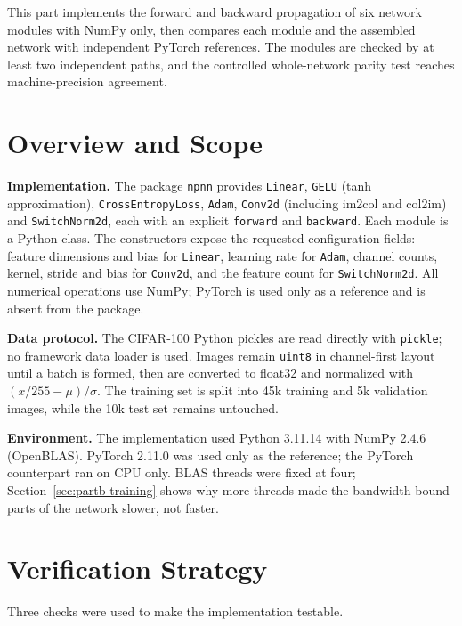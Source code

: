 \documentclass[10pt]{article}
\begin{document}
This part implements the forward and backward propagation of six network modules with NumPy only,
then compares each module and the assembled network with independent PyTorch references. The modules
are checked by at least two independent paths, and the controlled whole-network parity test reaches
machine-precision agreement.

\section{Overview and Scope}
\label{sec:partb-overview}

\textbf{Implementation.} The package \texttt{npnn} provides \texttt{Linear}, \texttt{GELU}
(tanh approximation), \texttt{CrossEntropyLoss}, \texttt{Adam}, \texttt{Conv2d} (including im2col
and col2im) and \texttt{SwitchNorm2d}, each with an explicit \texttt{forward} and \texttt{backward}.
Each module is a Python class. The constructors expose the requested configuration fields: feature
dimensions and bias for \texttt{Linear}, learning rate for \texttt{Adam}, channel counts, kernel,
stride and bias for \texttt{Conv2d}, and the feature count for \texttt{SwitchNorm2d}. All numerical
operations use NumPy; PyTorch is used only as a reference and is absent from the package.

\textbf{Data protocol.} The CIFAR-100 Python pickles are read directly with \texttt{pickle};
no framework data loader is used. Images remain \texttt{uint8} in channel-first layout until a batch
is formed, then are converted to float32 and normalized with $(x/255-\mu)/\sigma$. The training
set is split into 45k training and 5k validation images, while the 10k test set remains untouched.

\textbf{Environment.} The implementation used Python 3.11.14 with NumPy 2.4.6 (OpenBLAS). PyTorch 2.11.0 was used only as the reference;
the PyTorch counterpart ran on CPU only. BLAS threads were fixed at four; Section~\ref{sec:partb-training} shows why more threads
made the bandwidth-bound parts of the network slower, not faster.

\section{Verification Strategy}
\label{sec:partb-discipline}

Three checks were used to make the implementation testable.
\end{document}
